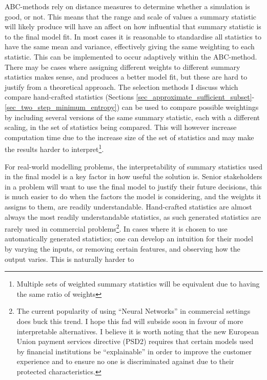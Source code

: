\documentclass[bibliography=totoc,11pt,a4paper,margin=0]{article}
\theoremstyle{break}
\begin{document}
  \par ABC-methods rely on distance measures to determine whether a simulation is good, or not. This means that the range and scale of values a summary statistic will likely produce will have an affect on how influential that summary statistic is to the final model fit. In most cases it is reasonable to standardise all statistics to have the same mean and variance, effectively giving the same weighting to each statistic. This can be implemented to occur adaptively within the ABC-method. There may be cases %
  where assigning different weights to different summary statistics makes sense, and produces a better model fit, but these are hard to justify from a theoretical approach. The selection methods I discuss which compare hand-crafted statistics (Sections \ref{sec_approximate_sufficient_subset}-\ref{sec_two_step_minimum_entropy}) can be used to compare possible weightings by including several versions of the same summary statistic, each with a different scaling, in the set of statistics being compared. This will however increase computation time due to the increase size of the set of statistics and may make the results harder to interpret\footnote{Multiple sets of weighted summary statistics will be equivalent due to having the same ratio of weights}.

  \par For real-world modelling problems, the interpretability of summary statistics used in the final model is a key factor in how useful the solution is. Senior stakeholders in a problem will want to use the final model to justify their future decisions, this is much easier to do when the factors the model is considering, and the weights it assigns to them, are readily understandable. Hand-crafted statistics are almost always the most readily understandable statistics, as such generated statistics are rarely used in commercial problems\footnote{The current popularity of using ``Neural Networks'' in commercial settings does buck this trend. I hope this fad will subside soon in favour of more interpretable alternatives. I believe it is worth noting that the new European Union payment services directive (PSD2) requires that certain models used by financial institutions be ``explainable'' in order to improve the customer experience and to ensure no one is discriminated against due to their protected characteristics.}. In cases where it is chosen to use automatically generated statistics; one can develop an intuition for their model by varying the inputs, or removing certain features, and observing how the output varies. This is naturally harder to
\end{document}
